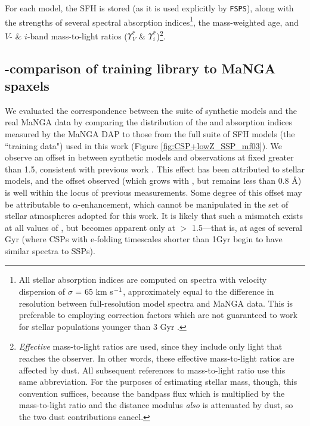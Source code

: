 For each model, the SFH is stored (as it is used explicitly by \texttt{FSPS}), along with the strengths of several spectral absorption indices\footnote{All stellar absorption indices are computed on spectra with velocity dispersion of $\sigma$ = 65 km s$^{\rm -1}$, approximately equal to the difference in resolution between full-resolution model spectra and MaNGA data. This is preferable to employing correction factors which are not guaranteed to work for stellar populations younger than 3 Gyr \citep{kuntschner_04_lick_losvd_corr}.}, the mass-weighted age, and $V$- \& $i$-band mass-to-light ratios ($\Upsilon^*_V$ \& $\Upsilon^*_i$)\footnote{\emph{Effective} mass-to-light ratios are used, since they include only light that reaches the observer. In other words, these effective mass-to-light ratios are affected by dust. All subsequent references to mass-to-light ratio use this same abbreviation. For the purposes of estimating stellar mass, though, this convention suffices, because the bandpass flux which is multiplied by the mass-to-light ratio and the distance modulus \emph{also} is attenuated by dust, so the two dust contributions cancel.}.

\subsection{\Dn-\HdeltaA comparison of training library to MaNGA spaxels}
\label{chap1:subsubsec:Dn4000-HdA_comp}

We evaluated the correspondence between the suite of synthetic models and the real MaNGA data by comparing the distribution of the \Dn and \HdeltaA absorption indices measured by the MaNGA DAP to those from the full suite of SFH models (the ``training data") used in this work (Figure \ref{fig:CSP+lowZ_SSP_mf03}). We observe an offset in \HdeltaA between synthetic models and observations at fixed \Dn greater than 1.5, consistent with previous work \citep[see][Figure 2]{kauffmann_heckman_white_03}. This effect has been attributed to stellar models, and the offset observed (which grows with \Dn, but remains less than 0.8 $\mbox{\AA}$) is well within the locus of previous measurements. Some degree of this offset may be attributable to $\alpha$-enhancement, which cannot be manipulated in the set of stellar atmospheres adopted for this work. It is likely that such a mismatch exists at all values of \Dn, but becomes apparent only at \Dn $>$ 1.5---that is, at ages of several Gyr (where CSPs with e-folding timescales shorter than 1Gyr begin to have similar spectra to SSPs).

